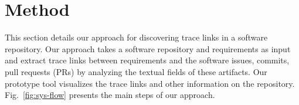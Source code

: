 \section{Method}
\label{sec:approach}

This section details our approach for discovering trace links in a software repository. Our approach takes a software repository and requirements as input and extract trace links between requirements and the software issues, commits, pull requests (PRs) by analyzing the textual fields of these artifacts. Our prototype tool visualizes the trace links and other information on the repository. Fig.~\ref{fig:sys-flow} presents the main steps of our approach.

